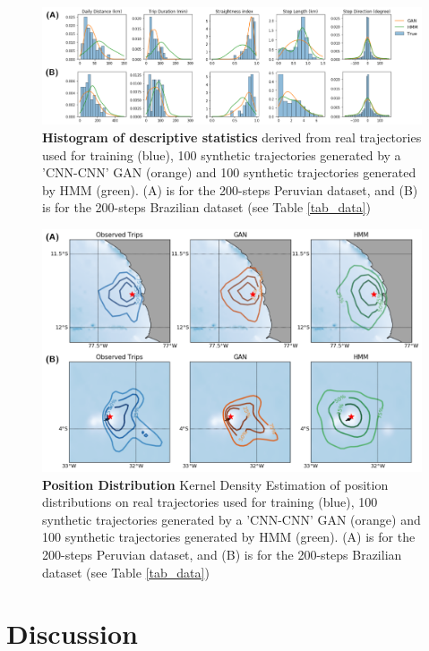 \documentclass{article}
\begin{document}
 \begin{figure}[ht]
  \centering
  \hspace*{-1.5cm}
  \includegraphics[scale=0.65]{2_histogram.png}
  \caption{\textbf{Histogram of descriptive statistics} derived from real trajectories used for training (blue), 100 synthetic trajectories generated by a 'CNN-CNN' GAN (orange) and 100 synthetic trajectories generated by HMM (green). (A) is for the 200-steps Peruvian dataset, and (B) is for the 200-steps Brazilian dataset (see Table \ref{tab_data})}
  \label{2_histogram}
\end{figure}


\begin{figure}[h]
  \centering
  \includegraphics[scale=0.5]{2_map.png}
  \caption{\textbf{Position Distribution} Kernel Density Estimation of position distributions on real trajectories used for training (blue), 100 synthetic trajectories generated by a 'CNN-CNN' GAN (orange) and 100 synthetic trajectories generated by HMM (green). (A) is for the 200-steps Peruvian dataset, and (B) is for the 200-steps Brazilian dataset (see Table \ref{tab_data})}
  \label{2_map}
\end{figure}

\section{Discussion}
\end{document}
